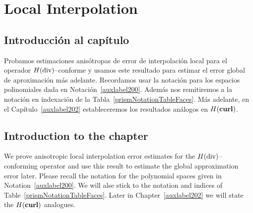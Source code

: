 \chapter{Local Interpolation}
\section*{Introducci\'on al cap\'itulo}
Probamos estimaciones anis\'otropas de error de interpolaci\'on local
para el operador 
$H(\operatorname{\textrm{div}})$--conforme
y usamos este resultado para estimar el error global de aproximaci\'on
m\'as adelante. Recordamos usar la notaci\'on para los espacios polinomiales
dada en Notaci\'on~\ref{auxlabel200}. Adem\'as nos remitiremos a la
notaci\'on en indexaci\'on de la Tabla~\ref{prismNotationTableFaces}.
M\'as adelante, en el Cap\'itulo~\ref{auxlabel202} 
estableceremos los resultados an\'alogos en $H(\textbf{curl})$.
\section*{Introduction to the chapter}
We prove anisotropic local interpolation error estimates
for the $H(\operatorname{\textrm{div}})$--conforming
operator
and use this result to estimate the global approximation error later. 
Please recall 
the notation for the polynomial spaces given in Notation~\ref{auxlabel200}. We 
will alse stick to the notation and indices of Table~\ref{prismNotationTableFaces}.
Later in Chapter~\ref{auxlabel202} we will state the $H(\textbf{curl})$ analogues.




